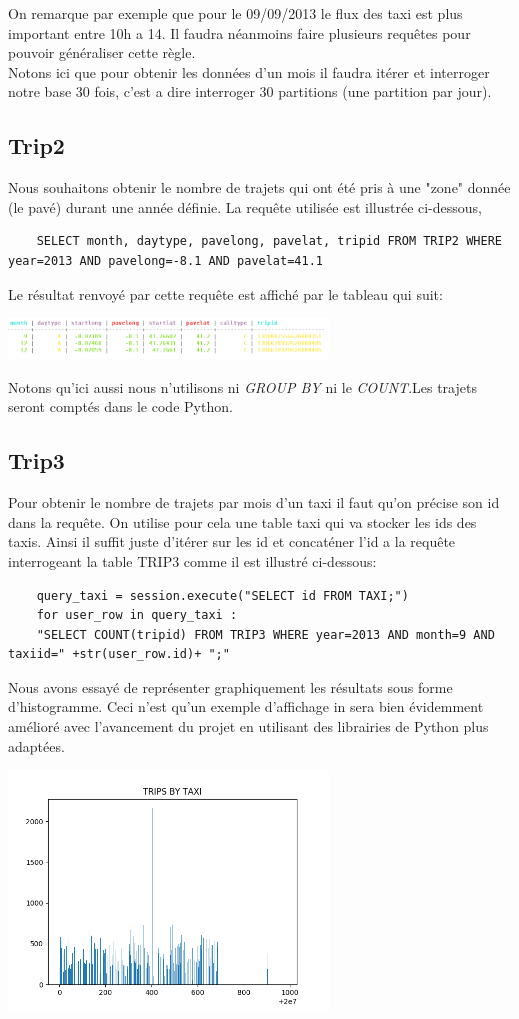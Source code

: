 \documentclass[]{report}
\begin{document}
	On remarque par exemple que pour le 09/09/2013 le flux des taxi est plus important entre 10h a 14. Il faudra néanmoins faire plusieurs requêtes pour pouvoir généraliser cette règle.\\
	Notons ici que pour obtenir les données d'un mois il faudra itérer et interroger notre base 30 fois, c'est a dire interroger 30 partitions (une partition par jour).
	\subsection{Trip2}
	Nous souhaitons obtenir le nombre de trajets qui ont été pris à une "zone" donnée  (le pavé) durant une année définie. La requête utilisée est illustrée ci-dessous,
	\begin{lstlisting}
	SELECT month, daytype, pavelong, pavelat, tripid FROM TRIP2 WHERE year=2013 AND pavelong=-8.1 AND pavelat=41.1
	\end{lstlisting}
	Le résultat renvoyé par cette requête est affiché par le tableau qui suit:
	\begin{center}
		\includegraphics[width=85mm]{Figures/pave.png}
	\end{center}
	Notons qu'ici aussi nous n'utilisons ni \textit{GROUP BY} ni le \textit{COUNT}.Les trajets seront comptés dans le code Python.
	
	\subsection{Trip3}
	Pour obtenir le nombre de trajets par mois d'un taxi il faut qu'on précise son id dans la requête. On utilise pour cela une table taxi qui va stocker les ids des taxis. Ainsi il suffit juste d'itérer sur les id et concaténer l'id a la requête interrogeant la table TRIP3 comme il est illustré ci-dessous:
	\begin{lstlisting}
	query_taxi = session.execute("SELECT id FROM TAXI;")
	for user_row in query_taxi : 
	"SELECT COUNT(tripid) FROM TRIP3 WHERE year=2013 AND month=9 AND taxiid=" +str(user_row.id)+ ";"  
	\end{lstlisting}
	Nous avons essayé de représenter graphiquement les résultats sous forme d'histogramme. Ceci n'est qu'un exemple d'affichage in sera bien évidemment amélioré avec l'avancement du projet en utilisant des librairies de Python plus adaptées.
	\begin{center}
		\includegraphics[width=85mm]{Figures/histogram_trip_by_taxi.png}
	\end{center}
\end{document}
